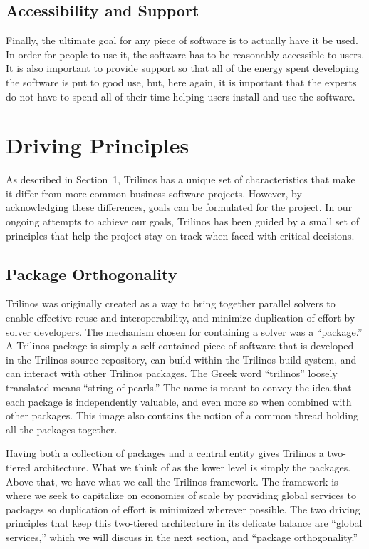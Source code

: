 \documentclass[times,10pt,twocolumn]{article}
\begin{document}
\subsection{Accessibility and Support}
Finally, the ultimate goal for any piece of software is to actually
have it be used. In order for people to use it, the software has to
be reasonably accessible to users.  It is also important to provide
support so that all of the energy spent developing the software is
put to good use, but, here again, it is important that the experts
do not have to spend all of their time helping users install and use
the software.


\section{Driving Principles}
\label{Section:Driving Principles}

As described in Section~1, Trilinos has a unique set of
characteristics that make it differ from more common business
software projects.  However, by acknowledging these differences,
goals can be formulated for the project. In our ongoing attempts to
achieve our goals, Trilinos has been guided by a small set of
principles that help the project stay on track when faced with
critical decisions.

\subsection{Package Orthogonality}

Trilinos was originally created as a way to bring together parallel
solvers to enable effective reuse and interoperability, and minimize
duplication of effort by solver developers.  The mechanism chosen
for containing a solver was a ``package.''  A Trilinos package is
simply a self-contained piece of software that is developed in the
Trilinos source repository, can build within the Trilinos build
system, and can interact with other Trilinos packages. The Greek
word ``trilinos'' loosely translated means ``string of pearls.'' The
name is meant to convey the idea that each package is independently
valuable, and even more so when combined with other packages. This
image also contains the notion of a common thread holding all the
packages together.

Having both a collection of packages and a central entity gives
Trilinos a two-tiered architecture.  What we think of as the lower
level is simply the packages.  Above that, we have what we call the
Trilinos framework.  The framework is where we seek to capitalize on
economies of scale by providing global services to packages so
duplication of effort is minimized wherever possible. The two
driving principles that keep this two-tiered architecture in its
delicate balance are ``global services,'' which we will discuss in
the next section, and ``package orthogonality.''
\end{document}
